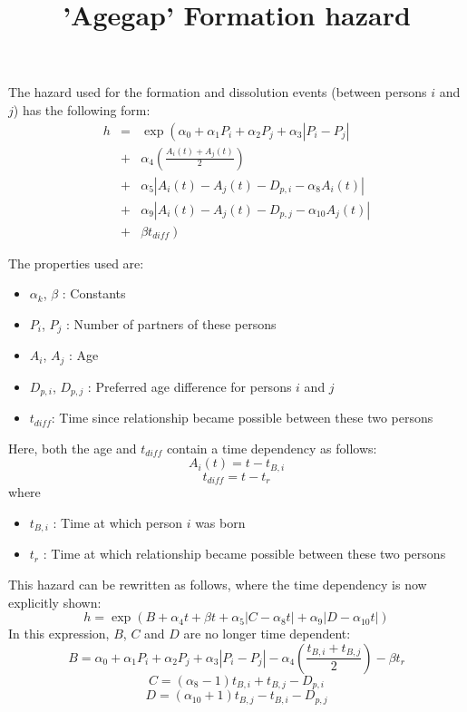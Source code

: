 \documentclass[a4paper,11pt]{article}
\begin{document}
	\title{\bf 'Agegap' Formation hazard}
	\maketitle

	The hazard used for the formation and dissolution events (between persons $i$ and $j$) has 
	the following form:
	\[ \begin{array}{lll}
		h & = & \exp\left( \alpha_0 + \alpha_1 P_i + \alpha_2 P_j  + \alpha_3|P_i - P_j| \right. \\
	      & + & \alpha_4 \left(\frac{A_i(t)+A_j(t)}{2}\right)  \\
		  &	+ & \alpha_5 |A_i(t)-A_j(t)-D_{p,i}-\alpha_8 A_i(t)| \\
		  & + & \alpha_9 |A_i(t)-A_j(t)-D_{p,j}-\alpha_{10} A_j(t)| \\
		  & + & \left. \beta t_{diff} \right) 
		\end{array}
	\]
	
	The properties used are:
	\begin{itemize}
		\item $\alpha_k$, $\beta$ : Constants
		\item $P_i$, $P_j$ : Number of partners of these persons
		\item $A_i$, $A_j$ : Age
		\item $D_{p,i}$, $D_{p,j}$ : Preferred age difference for persons $i$ and $j$
		\item $t_{diff}$: Time since relationship became possible between these two persons
	\end{itemize}

	Here, both the age and $t_{diff}$ contain a time dependency as follows:
	\[ A_i(t) = t - t_{B,i} \]
	\[ t_{diff} = t - t_r \]
	where
	\begin{itemize}
		\item $t_{B,i}$ : Time at which person $i$ was born
		\item $t_r$ : Time at which relationship became possible between these two persons
	\end{itemize}

	This hazard can be rewritten as follows, where the time dependency is now explicitly
	shown:
	\[ h = \exp\left(B + \alpha_4 t + \beta t + \alpha_5 |C-\alpha_8 t| + \alpha_9 | D-\alpha_{10} t | \right) \]
	In this expression, $B$, $C$ and $D$ are no longer time dependent:
	\[ B = \alpha_0 + \alpha_1 P_i + \alpha_2 P_j  + \alpha_3|P_i - P_j|
	                - \alpha_4\left(\frac{t_{B,i}+t_{B,j}}{2}\right)
					- \beta t_r \]
	\[ C = (\alpha_8 - 1)t_{B,i} + t_{B,j} - D_{p,i} \]
	\[ D = (\alpha_{10} + 1)t_{B,j} - t_{B,i} - D_{p,j} \]
\end{document}
